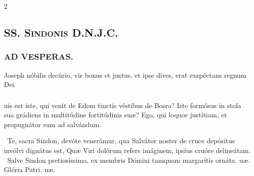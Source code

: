 \documentclass[9pt,twoside]{extarticle}
\begin{document}
\begin{multicols}{2}
\subsection*{\center \textsc{SS. Sindonis D.N.J.C.}}
\subsubsection*{\center {}}
\subsubsection*{\center \textsc{AD VESPERAS.}}
    \begin{tightlist}{}
\item {} Joseph nóbilis decúrio, vir bonus et justus, et ipse dives, erat exspéctans regnum Dei.
\item {}
\end{tightlist}

\subsubsection*{}
uis est iste, qui venit de Edom tinctis véstibus de Bosra? Iste formósus in stola sua grádiens in multitúdine fortitúdinis suæ? Ego, qui loquor justítiam, et propugnátor sum ad salvándum.

\begin{tightlist}{}
\item {}~Te, sacra Sindon, devóte venerámur, qua Salvátor noster de cruce depósitus invólvi dignátus est, \textred{*} Quæ Viri dolórum refers imáginem, ipsíus cruóre delineátam. ~Salve Sindon pretiosíssima, ex membris Dómini tamquam margarítis ornáta. uæ. Glória Patri. uæ.
\end{tightlist}


\end{multicols}
\end{document}

